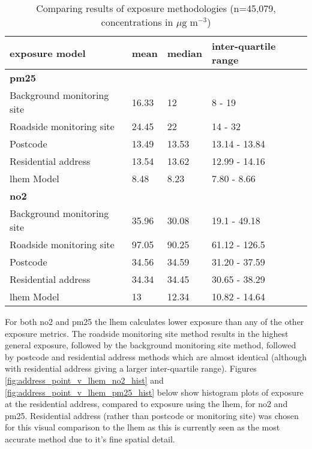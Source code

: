 \begin{table}[H]
\caption{Comparing results of exposure methodologies (n=45,079, concentrations in $\mu \text{g m}^{-3}$)}
\centering
    \begin{tabular}{ | l | l | l | l | }
    \hline 
exposure model & mean & median & inter-quartile range                              \\ \hline
\multicolumn{4}{|l|}{\bfseries{\gls{pm25}}}                         \\ \hline
Background monitoring site & 16.33 & 12     & 8 - 19                \\ \hline
Roadside monitoring site   & 24.45 & 22     & 14 - 32               \\ \hline
Postcode                   & 13.49 & 13.53  & 13.14 - 13.84         \\ \hline
Residential address        & 13.54 & 13.62  & 12.99 - 14.16         \\ \hline
\gls{lhem} Model                 & 8.48  & 8.23   & 7.80 - 8.66           \\ \hline
\multicolumn{4}{|l|}{\bfseries{\gls{no2}}}                           \\ \hline
Background monitoring site & 35.96 & 30.08  & 19.1 - 49.18          \\ \hline
Roadside monitoring site   & 97.05 & 90.25  & 61.12 - 126.5         \\ \hline
Postcode                   & 34.56 & 34.59  & 31.20 - 37.59         \\ \hline
Residential address        & 34.34 & 34.45  & 30.65 - 38.29         \\ \hline
\gls{lhem} Model                 & 13    & 12.34  & 10.82 - 14.64         \\ \hline
\end{tabular}
\label{tab:comparing_methods}
\end{table}

For both \gls{no2} and \gls{pm25} the \gls{lhem} calculates lower exposure than any of the other exposure metrics. The roadside monitoring site method results in the highest general exposure, followed by the background monitoring site method, followed by postcode and residential address methods which are almost identical (although with residential address giving a larger inter-quartile range). Figures \ref{fig:address_point_v_lhem_no2_hist} and \ref{fig:address_point_v_lhem_pm25_hist} below show histogram plots of exposure at the residential address, compared to exposure using the \gls{lhem}, for \gls{no2} and \gls{pm25}. Residential address (rather than postcode or monitoring site) was chosen for this visual comparison to the \gls{lhem} as this is currently seen as the most accurate method due to it's fine spatial detail.

